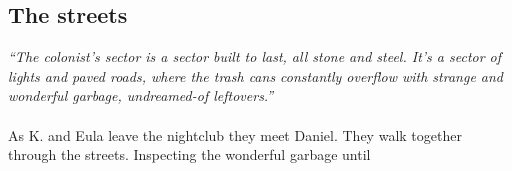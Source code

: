 \documentclass{article}
\begin{document}
\paragraph{}

\subsection*{The streets}
\textit{``The colonist's sector is a sector built to last, all stone and steel. It's a sector of lights and paved roads, where the trash cans constantly overflow with strange and wonderful garbage, undreamed-of leftovers.''}
\paragraph{}
As K. and Eula leave the nightclub they meet Daniel. They walk together through the streets. Inspecting the wonderful garbage until 

\subsection{}
\end{document}
